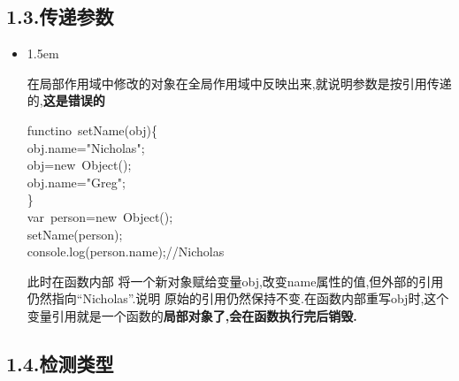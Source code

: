 \documentclass{article}
\begin{document}
\subsection{1.3.\hspace*{0.5em}传递参数}\label{section}%

\begin{itemize}[noitemsep,topsep=\mdcompacttopsep]%

 -\textgreater{} 传递的是复制后的新值%

\item{}
\begin{mddefinitions}%


\begin{mdbmarginx}{}{}{}{1.5em}%
\begin{mddefdata}%
在局部作用域中修改的对象在全局作用域中反映出来,就说明参数是按引用传递的,\textbf{这是错误的}%
\end{mddefdata}%
\end{mdbmarginx}%
\end{mddefinitions}%
\begin{mdpre}%
\noindent functino~setName(obj)\{\\
obj.name={"}{Nicholas}{"};\\
obj={new}~Object();\\
obj.name={"}{Greg}{"};\\
\}\\
{var}~person={new}~Object();\\
setName(person);\\
console.log(person.name);{//Nicholas}%
\end{mdpre}此时在函数内部 将一个新对象赋给变量obj,改变name属性的值,但外部的引用仍然指向\textquotedblleft{}Nicholas\textquotedblright{}.说明 原始的引用仍然保持不变.在函数内部重写obj时,这个变量引用就是一个函数的\textbf{局部对象了,会在函数执行完后销毁.}%
\end{itemize}%

\subsection{1.4.\hspace*{0.5em}检测类型}\label{section}%
\end{document}
